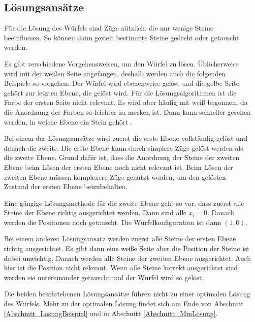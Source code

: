 \documentclass[12pt,a4paper, usenames, dvipsnames]{article}
\theoremstyle{mystyle}
\theoremstyle{definition}
\begin{document}
%
%
%
%
%
%
%
%
%
%
%
%
%
%
%
%
%
%
%
%
\subsection{Lösungsansätze}

Für die Lösung des Würfels sind Züge nützlich, die nur wenige Steine beeinflussen. So können dann gezielt bestimmte Steine gedreht oder getauscht werden. 

Es gibt verschiedene Vorgehensweisen, um den Würfel zu lösen. Üblicherweise wird mit der weißen Seite angefangen, deshalb werden auch die folgenden Beispiele so vorgehen. Der Würfel wird ebenenweise gelöst und die gelbe Seite gehört zur letzten Ebene, die gelöst wird. 
Für die Lösungsalgorithmen ist die Farbe der ersten Seite nicht relevant. Es wird aber häufig mit weiß begonnen, da die Anordnung der Farben so leichter zu merken ist. Dann kann schneller gesehen werden, in welche Ebene ein Stein gehört \cite{RF}. 

Bei einem der Lösungsansätze wird zuerst die erste Ebene vollständig gelöst und danach die zweite. Die erste Ebene kann durch simplere Züge gelöst werden als die zweite Ebene. Grund dafür ist, dass die Anordnung der Steine der zweiten Ebene beim Lösen der ersten Ebene noch nicht relevant ist. Beim Lösen der zweiten Ebene müssen komplexere Züge genutzt werden, um den gelösten Zustand der ersten Ebene beizubehalten. 

Eine gängige Lösungsmethode für die zweite Ebene geht so vor, dass zuerst alle Steine der Ebene richtig ausgerichtet werden. Dann sind alle $x_i=0$. Danach werden die Positionen noch getauscht. Die Würfelkonfiguration ist dann $(1,0)$.

Bei einem anderen Lösungsansatz werden zuerst alle Steine der ersten Ebene richtig ausgerichtet. Es gibt dann eine weiße Seite aber die Position der Steine ist dabei unwichtig. Danach werden alle Steine der zweiten Ebene ausgerichtet. Auch hier ist die Position nicht relevant. Wenn alle Steine korrekt ausgerichtet sind, werden sie untereinander getauscht und der Würfel wird so gelöst.

Die beiden beschriebenen Lösungsansätze führen nicht zu einer optimalen Lösung des Würfels. Mehr zu der optimalen Lösung findet sich am Ende von Abschnitt \ref{Abschnitt_LösungBeispiel} und in Abschnitt \ref{Abschnitt_MinLösung}.
\end{document}
